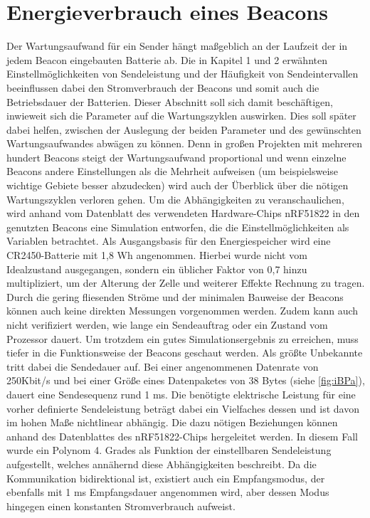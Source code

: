 \section{Energieverbrauch eines Beacons} 
Der Wartungsaufwand für ein Sender hängt maßgeblich an der Laufzeit der in jedem Beacon eingebauten Batterie ab. Die in Kapitel 1 und 2 erwähnten Einstellmöglichkeiten von Sendeleistung und der Häufigkeit von Sendeintervallen beeinflussen dabei den Stromverbrauch der Beacons und somit auch die Betriebsdauer der Batterien. Dieser Abschnitt soll sich damit beschäftigen, inwieweit sich die Parameter auf die Wartungszyklen auswirken. Dies soll später dabei helfen, zwischen der Auslegung der beiden Parameter und des gewünschten Wartungsaufwandes abwägen zu können. Denn in großen Projekten mit mehreren hundert Beacons steigt der Wartungsaufwand proportional und wenn einzelne Beacons andere Einstellungen als die Mehrheit aufweisen (um beispielsweise wichtige Gebiete besser abzudecken) wird auch der Überblick über die nötigen Wartungszyklen verloren gehen. Um die Abhängigkeiten zu veranschaulichen, wird anhand vom Datenblatt des verwendeten Hardware-Chips nRF51822 \cite{nRF5} in den genutzten Beacons eine Simulation entworfen, die die Einstellmöglichkeiten als Variablen betrachtet. Als Ausgangsbasis für den Energiespeicher wird eine CR2450-Batterie mit 1,8 Wh \cite{CR2450} angenommen. Hierbei wurde nicht vom Idealzustand ausgegangen, sondern ein üblicher Faktor von 0,7 hinzu multipliziert, um der Alterung der Zelle und weiterer Effekte Rechnung zu tragen. Durch die gering fliesenden Ströme und der minimalen Bauweise der Beacons können auch keine direkten Messungen vorgenommen werden. Zudem kann auch nicht verifiziert werden, wie lange ein Sendeauftrag oder ein Zustand vom Prozessor dauert. Um trotzdem ein gutes Simulationsergebnis zu erreichen, muss tiefer in die Funktionsweise der Beacons geschaut werden. Als größte Unbekannte tritt dabei die Sendedauer auf. Bei einer angenommenen Datenrate von 250Kbit/s und bei einer Größe eines Datenpaketes von 38 Bytes \cite{iBPa} (siehe \ref{fig:iBPa}), dauert eine Sendesequenz rund 1 ms. Die benötigte elektrische Leistung für eine vorher definierte Sendeleistung beträgt dabei ein Vielfaches dessen und ist davon im hohen Maße nichtlinear abhängig. Die dazu nötigen Beziehungen können anhand des Datenblattes des nRF51822-Chips hergeleitet werden. In diesem Fall wurde ein Polynom 4. Grades als Funktion der einstellbaren Sendeleistung aufgestellt, welches annähernd diese Abhängigkeiten beschreibt. Da die Kommunikation bidirektional ist, existiert auch ein Empfangsmodus, der ebenfalls mit 1 ms Empfangsdauer angenommen wird, aber dessen Modus hingegen einen konstanten Stromverbrauch aufweist.
